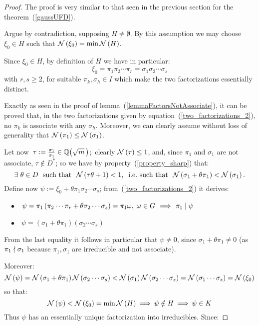 \begin{proof}
%
The proof is very similar to that seen in the previous
section for the theorem~(\ref{gaussUFD}).

Argue by contradiction, supposing $H \neq \emptyset$.
By this assumption we may choose $\xi_0\in H$ such that
$\mathcal{N}\left(\xi_0\right) = \min{\mathcal{N}\left(H\right)}$.

Since $\xi_0 \in H$, by definition of $H$ we have in
particular:
\begin{equation}\label{two_factorizations_2}
\xi_0 = \pi_1\pi_2\cdots\pi_r =
\sigma_1\sigma_2\cdots\sigma_s
\end{equation}
with $r,s \geq 2$, for suitable $\pi_k,\sigma_h \in I$
which make the two factorizations essentially distinct.

Exactly as seen in the proof of lemma~(\ref{lemmaFactorsNotAssociate}),
it can be proved that, in the two factorizations given by
equation~(\ref{two_factorizations_2}), no $\pi_k$ is associate
with any $\sigma_h$.
Moreover, we can clearly assume without loss of generality
that $\mathcal{N}\left(\pi_1\right) \le \mathcal{N}\left(\sigma_1\right)$.

Let now \,$\tau:= \frac{\pi_1}{\sigma_1} \in
\QQ{m}$;\, clearly $\mathcal{N}\left(\tau\right) \leq 1$,
and, since $\pi_1$ and $\sigma_1$ are not associate,
$\tau \notin D^\ast$; so we have by property~(\ref{property_sharp})
that:
\begin{equation*}
\exists\ \theta \in D
~~\textrm{such that}~~
\mathcal{N}\left(\tau\theta + 1\right) < 1,
~\:\textrm{\text{i.e.\ }such that}~~
\mathcal{N}\left(\sigma_1 + \theta\pi_1\right) < \mathcal{N}\left(\sigma_1\right).
\end{equation*}
Define now
$\psi:= \xi_0 + \theta\pi_1\sigma_2\cdots\sigma_s$;
from~(\ref{two_factorizations_2}) it derives:

~~$\bullet$~~\:$\psi = \pi_1 \left( \pi_2\cdots\pi_r +
\theta\sigma_2\cdots\sigma_s \right) = \pi_1\omega,\;
\omega \in G\, \:\Longrightarrow\:\, \pi_1 \mid \psi$

~~$\bullet$~~\:$\psi = \left( \sigma_1 + \theta\pi_1 \right)
\left( \sigma_2\cdots\sigma_s  \right)$

From the last equality it follows in particular that
$\psi \neq 0$, since $\sigma_1 + \theta\pi_1 \not= 0$
(as $\pi_1 \nmid \sigma_1$ because $\pi_1, \sigma_1$
are irreducible and not associate).

Moreover:
\begin{equation*}
\mathcal{N}\left(\psi\right) =
   \mathcal{N}\left(\sigma_1 + \theta\pi_1\right)
   \mathcal{N}\left(\sigma_2\cdots\sigma_s\right) 
< \mathcal{N}\left(\sigma_1\right)\mathcal{N}\left(\sigma_2\cdots\sigma_s\right)
= \mathcal{N}\left(\sigma_1\cdots\sigma_s\right) = \mathcal{N}\left(\xi_0\right)
\end{equation*}
so that:
\begin{equation*}
\mathcal{N}\left(\psi\right) < \mathcal{N}\left(\xi_0\right) = \min{\mathcal{N}\left(H\right)} \:\Longrightarrow\:
\psi \notin H \:\Longrightarrow\: \psi \in K 
\end{equation*}
%
Thus $\psi$ has an essentially unique factorization into
irreducibles. Since:


\end{proof}

